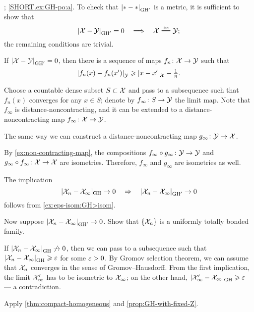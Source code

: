 \parbf{\ref{ex:GH-po}}; \ref{SHORT.ex:GH-po:a}.
To check that $\dist{*}{*}{\GH'}$ is a metric, it is sufficient to show that
\[\dist{\spc{X}}{\spc{Y}}{\GH'}=0 
\quad\Longrightarrow\quad
\spc{X}\iso\spc{Y};\]
the remaining conditions are trivial.

If $\dist{\spc{X}}{\spc{Y}}{\GH'}=0$, then there is a sequence of maps $f_n\colon\mathcal{X}\to \mathcal{Y}$ such that 
\[\dist{f_n(x)}{f_n(x')}{\spc{Y}}\ge \dist{x}{x'}{\spc{X}}-\tfrac1n.\]

Choose a countable dense subset $S\subset \mathcal{X}$ and pass to a subsequence such that $f_n(x)$ converges for any $x\in S$; denote by $f_\infty\colon S\to \mathcal{Y}$ the limit map.
Note that $f_\infty$ is distance-noncontracting, and it can be extended to a distance-noncontracting map $f_\infty\colon\mathcal{X}\to \mathcal{Y}$.

The same way we can construct a distance-noncontracting map 
$g_\infty\colon\mathcal{Y}\to \mathcal{X}$.

By \ref{ex:non-contracting-map}, the compositions $f_\infty\circ g_\infty\colon\mathcal{Y}\to \mathcal{Y}$ and $g_\infty\z\circ f_\infty\:\spc{X}\to \spc{X}$ are isometries.
Therefore, $f_\infty$ and $g_\infty$ are isometries as well.

 The implication 
\[|\spc{X}_n-\spc{X}_\infty|_{\GH}\to 0 
\quad\Rightarrow\quad 
\dist{\spc{X}_n}{\spc{X}_\infty}{\GH'}\to 0\]
follows from \ref{ex:eps-isom:GH>isom}. 

Now suppose $\dist{\spc{X}_n}{\spc{X}_\infty}{\GH'}\to 0$.
Show that $\{\mathcal{X}_n\}$ is a uniformly totally bonded family.

If $\dist{\spc{X}_n}{\spc{X}_\infty}{\GH}\not\to 0$, then we can pass to a subsequence such that $\dist{\spc{X}_n}{\spc{X}_\infty}{\GH}\ge\eps$ for some $\varepsilon>0$.
By Gromov selection theorem, we can assume that $\mathcal{X}_n$ converges in the sense of Gromov--Hausdorff.
From the first implication, the limit $\mathcal{X}_\infty'$ has to be isometric to $\mathcal{X}_\infty$;
on the other hand, $\dist{\spc{X}_\infty'}{\spc{X}_\infty}{\GH}\ge \eps$ --- a contradiction.

Apply \ref{thm:compact-homogeneous} and \ref{prop:GH-with-fixed-Z}.

